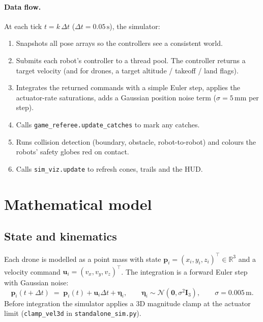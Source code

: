 \documentclass[11pt,a4paper]{article}
\newcommand{\code}[1]{\texttt{#1}}
\newcommand{\vect}[1]{\mathbf{#1}}
\begin{document}
\paragraph{Data flow.}
At each tick $t = k\,\Delta t$ ($\Delta t = 0.05\,\text{s}$), the simulator:
\begin{enumerate}[leftmargin=1.4em]
  \item Snapshots all pose arrays so the controllers see a consistent world.
  \item Submits each robot's controller to a thread pool. The controller
        returns a target velocity (and for drones, a target altitude / takeoff
        / land flags).
  \item Integrates the returned commands with a simple Euler step, applies
        the actuator-rate saturations, adds a Gaussian position noise term
        ($\sigma = 5\,\text{mm}$ per step).
  \item Calls \code{game\_referee.update\_catches} to mark any catches.
  \item Runs collision detection (boundary, obstacle, robot-to-robot) and
        colours the robots' safety globes red on contact.
  \item Calls \code{sim\_viz.update} to refresh cones, trails and the HUD.
\end{enumerate}

\section{Mathematical model}

\subsection{State and kinematics}

Each drone is modelled as a point mass with state
$\vect{p}_i = (x_i, y_i, z_i)^\top \in \mathbb{R}^3$ and a velocity command
$\vect{u}_i = (v_x, v_y, v_z)^\top$. The integration is a forward Euler step
with Gaussian noise:
\[
    \vect{p}_i(t+\Delta t) \;=\; \vect{p}_i(t) + \vect{u}_i \Delta t + \vect{\eta}_i,
    \qquad
    \vect{\eta}_i \sim \mathcal{N}\!\left(\vect{0}, \sigma^2 \vect{I}_3\right),
    \qquad \sigma = 0.005\,\text{m}.
\]
Before integration the simulator applies a 3D magnitude clamp at the actuator
limit (\code{clamp\_vel3d} in \code{standalone\_sim.py}).
\end{document}
